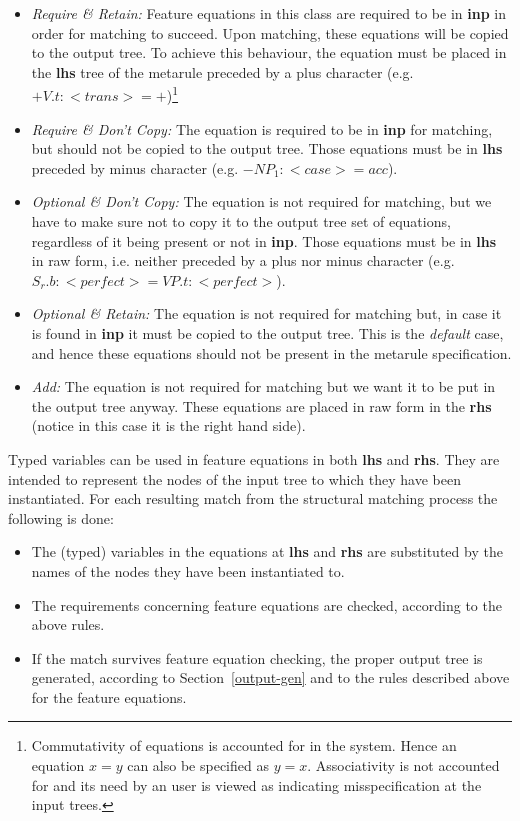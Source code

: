 \begin{itemize}
\item	{\it Require \& Retain:} Feature equations in this class
	are required to be in {\bf inp} in order for matching to succeed.
	Upon matching, these equations will be copied to the output tree.
	To achieve this behaviour, the equation must be placed in 
	the {\bf lhs} tree of the metarule preceded by a plus character
	(e.g. $+V.t:<trans>=+$)\footnote{Commutativity of equations is 
	accounted for in the system. Hence an equation $x=y$ can also be
	specified as $y=x$. Associativity is not accounted for and its need by
	an user is viewed as indicating misspecification at the input trees.}
	
\item	{\it Require \& Don't Copy:} The equation is required to be in 
	{\bf inp}
	for matching, but should not be copied to the output tree.
	Those equations must be in {\bf lhs} preceded by minus character
	(e.g. $-NP_1:<case>=acc$).

\item	{\it Optional \& Don't Copy:} 
	The equation is not required for matching,
	but we have to make sure not to copy it to the output tree set of
	equations, regardless of it being present or not in {\bf inp}.
	Those equations must be in {\bf lhs} in raw form, i.e. neither preceded
	by a plus nor minus character
	(e.g. $S_r.b:<perfect>=VP.t:<perfect>$).

\item	{\it Optional \& Retain:} 
	The equation is not required for matching but,
	in case it is found in {\bf inp} it must be copied to the output tree.
	This is the {\it default} case, and hence these equations should not be
	present in the metarule specification.

\item	{\it Add:} The equation is not required for matching but we want it to
	be put in the output tree anyway.
	These equations are placed in raw form in the {\bf rhs} (notice in this
	case it is the right hand side).
\end{itemize}

Typed variables can be used in feature equations in both {\bf lhs} and 
{\bf rhs}. They are intended to represent the nodes of the input tree to which
they have been instantiated. For each resulting match 
from the structural matching process the following is done:

\begin{itemize}
\item	The (typed) variables in the equations at {\bf lhs} and {\bf rhs} are 
	substituted by the names of the nodes they have been instantiated to.

\item	The requirements concerning feature equations are checked, according
	to the above rules.

\item	If the match survives feature equation checking, the proper output tree
	is generated, according to Section~\ref{output-gen} and to the 
	rules described above for the feature equations.
\end{itemize}

